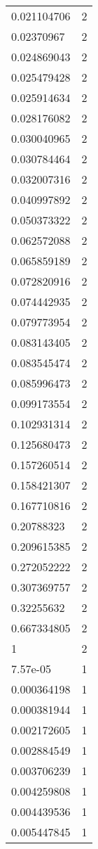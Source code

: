 \begin{table}[ht]
\begin{tabular}{lr}
  0.021104706 &   2 \\ 
  0.02370967 &   2 \\ 
  0.024869043 &   2 \\ 
  0.025479428 &   2 \\ 
  0.025914634 &   2 \\ 
  0.028176082 &   2 \\ 
  0.030040965 &   2 \\ 
  0.030784464 &   2 \\ 
  0.032007316 &   2 \\ 
  0.040997892 &   2 \\ 
  0.050373322 &   2 \\ 
  0.062572088 &   2 \\ 
  0.065859189 &   2 \\ 
  0.072820916 &   2 \\ 
  0.074442935 &   2 \\ 
  0.079773954 &   2 \\ 
  0.083143405 &   2 \\ 
  0.083545474 &   2 \\ 
  0.085996473 &   2 \\ 
  0.099173554 &   2 \\ 
  0.102931314 &   2 \\ 
  0.125680473 &   2 \\ 
  0.157260514 &   2 \\ 
  0.158421307 &   2 \\ 
  0.167710816 &   2 \\ 
  0.20788323 &   2 \\ 
  0.209615385 &   2 \\ 
  0.272052222 &   2 \\ 
  0.307369757 &   2 \\ 
  0.32255632 &   2 \\ 
  0.667334805 &   2 \\ 
  1 &   2 \\ 
  7.57e-05 &   1 \\ 
  0.000364198 &   1 \\ 
  0.000381944 &   1 \\ 
  0.002172605 &   1 \\ 
  0.002884549 &   1 \\ 
  0.003706239 &   1 \\ 
  0.004259808 &   1 \\ 
  0.004439536 &   1 \\ 
  0.005447845 &   1 \\ 

\end{tabular}
\end{table}
